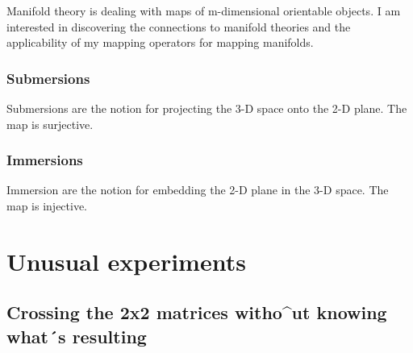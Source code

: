 \documentclass[a4paper]{article}
\begin{document}
Manifold theory is dealing with maps of m-dimensional orientable objects. I am interested in discovering the connections to manifold theories and the applicability of my mapping operators for mapping manifolds.

\subsubsection{Submersions}

Submersions are the notion for projecting the 3-D space onto the 2-D plane. The map is surjective.

\subsubsection{Immersions}

Immersion are the notion for embedding the 2-D plane in the 3-D space. The map is injective.




\appendix
\section{Unusual experiments}

\subsection{Crossing the 2x2 matrices witho^ut knowing what´s resulting}
\end{document}
